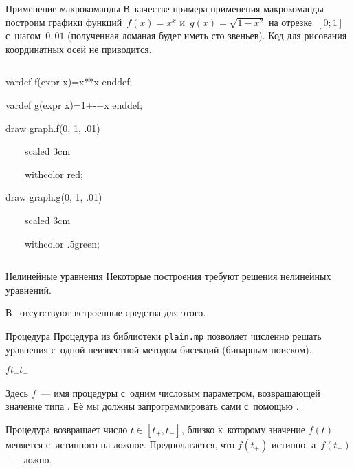 
\begin{frame}{Применение макрокоманды }
В~качестве примера применения макрокоманды  построим графики
функций $f(x)=x^x$ и~$g(x)=\sqrt{1-x^2}$ на отрезке $[0;1]$ с~шагом $0{,}01$
(полученная ломаная будет иметь сто звеньев). Код для рисования координатных
осей не приводится.

\begin{columns}
\centerline{}
\begin{programlisting}
vardef f(expr x)=x**x enddef;\par
vardef g(expr x)=1+-+x enddef;\par
\leavevmode\par
draw graph.f(0, 1, .01)\par
~~~~scaled 3cm\par
~~~~withcolor red;\par
draw graph.g(0, 1, .01)\par
~~~~scaled 3cm\par
~~~~withcolor .5green;
\end{programlisting}
\end{columns}
\end{frame}


\begin{frame}{Нелинейные уравнения}
Некоторые построения требуют решения нелинейных уравнений.

В~ отсутствуют встроенные средства для этого.
\end{frame}


\begin{frame}{Процедура }
Процедура  из библиотеки \nolinkurl{plain.mp} позволяет численно
решать уравнения с~одной неизвестной методом бисекций (бинарным поиском).

\begin{center}
\LARGE
{}$f$\literal{(}$t_+$\literal{,}$t_-$\literal{)}
\end{center}

Здесь $f$~— имя процедуры с~одним числовым параметром, возвращающей значение
типа . Её мы должны запрограммировать сами с~помощью
.

Процедура  возвращает число $t\in[t_+,t_-]$, близко к~которому
значение $f(t)$ меняется с~истинного на ложное. Предполагается, что $f(t_+)$
истинно, а~$f(t_-)$~— ложно.
\end{frame}

